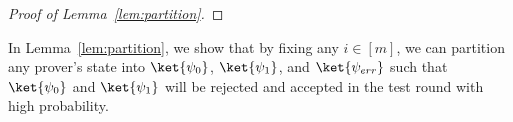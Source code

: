 \begin{proof}[Proof of Lemma~\ref{lem:partition}]

\end{proof}


In Lemma~\ref{lem:partition}, we show that by fixing any $i\in [m]$, we can partition any prover's state into $\ket{\psi_0}$, $\ket{\psi_1}$, and $\ket{\psi_{err}}$ such that $\ket{\psi_0}$ and $\ket{\psi_1}$ will be rejected and accepted in the test round with high probability.

